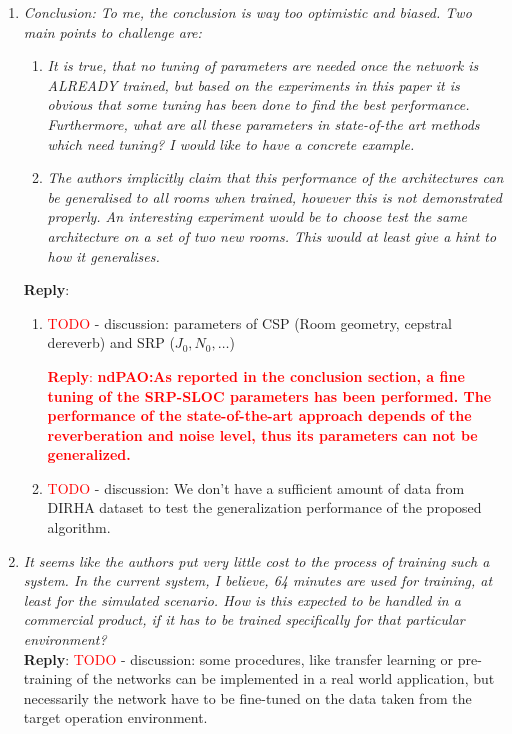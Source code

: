 \documentclass[11pt, technote, letterpaper, oneside, onecolumn]{IEEEtran}
\begin{document}
\begin{enumerate}
\item \textit{Conclusion: To me, the conclusion is way too optimistic and biased. Two main points to challenge are:}
	\begin{enumerate}
		\item  \textit{It is true, that no tuning of parameters are needed once the network is ALREADY trained, but based on the experiments in this paper it is obvious that some tuning has been done to find the best performance. Furthermore, what are all these parameters in state-of-the art methods which need tuning? I would like to have a concrete example.}
		\item  \textit{The authors implicitly claim that this performance of the architectures can be generalised to all rooms when trained, however this is not demonstrated properly. An interesting experiment would be to choose test the same architecture on a set of two new rooms. This would at least give a hint to how it generalises.}
	\end{enumerate}
 \textbf{Reply}:
 \begin{enumerate}
 	\item \textcolor{red}{TODO} - discussion: parameters of CSP (Room geometry, cepstral dereverb) and SRP ($J_0, N_0, \dots$)
 	
 	 \textcolor{red}{\textbf{Reply}: \textbf{ndPAO:As reported in the conclusion section, a fine tuning of the SRP-SLOC parameters has been performed. The performance of the state-of-the-art approach depends of the reverberation and noise level, thus its parameters can not be generalized.} }
 	 
 	\item \textcolor{red}{TODO} - discussion: We don't have a sufficient amount of data from DIRHA dataset to test the generalization performance of the proposed algorithm. 
 \end{enumerate}

\item \textit{It seems like the authors put very little cost to the process of training such a system. In the current system, I believe, 64 minutes are used for training, at least for the simulated scenario. How is this expected to be handled in a commercial product, if it has to be trained specifically for that particular environment?\\}
\textbf{Reply}:
\textcolor{red}{TODO} - discussion: some procedures, like transfer learning or pre-training of the networks can be implemented in a real world application, but necessarily the network have to be fine-tuned on the data taken from the target operation environment.


\end{enumerate}
\end{document}
